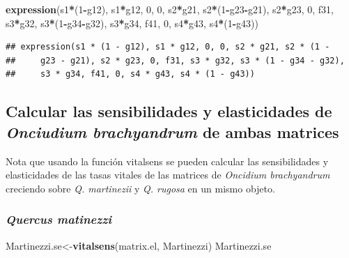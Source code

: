 \documentclass[
]{book}
\newenvironment{Shaded}{\begin{snugshade}}{\end{snugshade}}
\newcommand{\DecValTok}[1]{\textcolor[rgb]{0.00,0.00,0.81}{#1}}
\newcommand{\FunctionTok}[1]{\textcolor[rgb]{0.13,0.29,0.53}{\textbf{#1}}}
\newcommand{\NormalTok}[1]{#1}
\newcommand{\OtherTok}[1]{\textcolor[rgb]{0.56,0.35,0.01}{#1}}
\newcommand{\SpecialCharTok}[1]{\textcolor[rgb]{0.81,0.36,0.00}{\textbf{#1}}}
\theoremstyle{definition}
\theoremstyle{definition}
\theoremstyle{definition}
\theoremstyle{definition}
\theoremstyle{remark}
\begin{document}
\begin{Shaded}
\begin{Highlighting}[]
\FunctionTok{expression}\NormalTok{(s1}\SpecialCharTok{*}\NormalTok{(}\DecValTok{1}\SpecialCharTok{{-}}\NormalTok{g12), s1}\SpecialCharTok{*}\NormalTok{g12, }\DecValTok{0}\NormalTok{, }\DecValTok{0}\NormalTok{, s2}\SpecialCharTok{*}\NormalTok{g21, s2}\SpecialCharTok{*}\NormalTok{(}\DecValTok{1}\SpecialCharTok{{-}}\NormalTok{g23}\SpecialCharTok{{-}}\NormalTok{g21), }
\NormalTok{    s2}\SpecialCharTok{*}\NormalTok{g23, }\DecValTok{0}\NormalTok{, f31, s3}\SpecialCharTok{*}\NormalTok{g32, s3}\SpecialCharTok{*}\NormalTok{(}\DecValTok{1}\SpecialCharTok{{-}}\NormalTok{g34}\SpecialCharTok{{-}}\NormalTok{g32), s3}\SpecialCharTok{*}\NormalTok{g34, f41, }\DecValTok{0}\NormalTok{, s4}\SpecialCharTok{*}\NormalTok{g43, }
\NormalTok{    s4}\SpecialCharTok{*}\NormalTok{(}\DecValTok{1}\SpecialCharTok{{-}}\NormalTok{g43))}
\end{Highlighting}
\end{Shaded}

\begin{verbatim}
## expression(s1 * (1 - g12), s1 * g12, 0, 0, s2 * g21, s2 * (1 - 
##     g23 - g21), s2 * g23, 0, f31, s3 * g32, s3 * (1 - g34 - g32), 
##     s3 * g34, f41, 0, s4 * g43, s4 * (1 - g43))
\end{verbatim}

\subsection{\texorpdfstring{Calcular las sensibilidades y elasticidades de \emph{Onciudium brachyandrum} de ambas matrices}{Calcular las sensibilidades y elasticidades de Onciudium brachyandrum de ambas matrices}}\label{calcular-las-sensibilidades-y-elasticidades-de-onciudium-brachyandrum-de-ambas-matrices}

Nota que usando la función vitalsens se pueden calcular las sensibilidades y elasticidades de las tasas vitales de las matrices de \emph{Oncidium brachyandrum} creciendo sobre \emph{Q. martinezii} y \emph{Q. rugosa} en un mismo objeto.

\subsubsection{\texorpdfstring{\emph{Quercus matinezzi}}{Quercus matinezzi}}\label{quercus-matinezzi}

\begin{Shaded}
\begin{Highlighting}[]
\NormalTok{Martinezzi.se}\OtherTok{\textless{}{-}}\FunctionTok{vitalsens}\NormalTok{(matrix.el, Martinezzi)}
\NormalTok{Martinezzi.se}
\end{Highlighting}
\end{Shaded}
\end{document}
